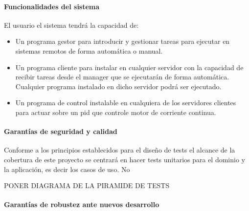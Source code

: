 \paragraph{Funcionalidades del sistema}

El usuario el sistema tendrá la capacidad de:

\begin{itemize}
    \item Un programa gestor para introducir y gestionar tareas para ejecutar en sistemas remotos de forma automática o manual.
    \item Un programa cliente para instalar en cualquier servidor con la capacidad de recibir tareas desde el manager que se ejecutarán de forma automática.
    Cualquier programa instalado en dicho servidor podrá ser ejecutado.
    \item Un programa de control instalable en cualquiera de los servidores clientes para actuar sobre un pid que controle motor de corriente continua.
\end{itemize}

\paragraph{Garantías de seguridad y calidad}\label{par:testing}
    Conforme a los principios establecidos para el diseño de tests el alcance de la cobertura de este proyecto se centrará en hacer tests unitarios para el dominio y la aplicación, es decir los casos de uso.
    No

    PONER DIAGRAMA DE LA PIRAMIDE DE TESTS
%    

\paragraph{Garantías de robustez ante nuevos desarrollo}







